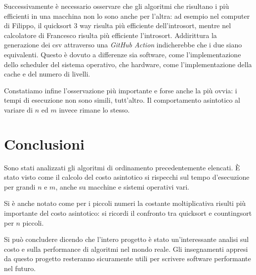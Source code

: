 \documentclass{article}
\begin{document}
    Successivamente è necessario osservare che gli algoritmi che risultano i più efficienti in una macchina non lo sono anche per l'altra: ad esempio nel computer di Filippo, il quicksort 3 way risulta più efficiente dell'introsort, mentre nel calcolatore di Francesco risulta più efficiente l'introsort. Addirittura la generazione dei csv attraverso una \textit{GitHub Action} indicherebbe che i due siano equivalenti. Questo è dovuto a differenze sia software, come l'implementazione dello scheduler del sistema operativo, che hardware, come l'implementazione della cache e del numero di livelli.

    Constatiamo infine l'osservazione più importante e forse anche la più ovvia: i tempi di esecuzione non sono simili, tutt'altro. Il comportamento asintotico al variare di $n$ ed $m$ invece rimane lo stesso.

\section{Conclusioni}
    Sono stati analizzati gli algoritmi di ordinamento precedentemente elencati. È stato visto come il calcolo del costo asintotico si rispecchi sul tempo d'esecuzione per grandi $n$ e $m$, anche su macchine e sistemi operativi vari.

    Si è anche notato come per i piccoli numeri la costante moltiplicativa risulti più importante del costo asintotico: si ricordi il confronto tra quicksort e countingsort per $n$ piccoli.

    Si può concludere dicendo che l'intero progetto è stato un'interessante analisi sul costo e sulla performance di algoritmi nel mondo reale. Gli insegnamenti appresi da questo progetto resteranno sicuramente utili per scrivere software performante nel futuro.
\end{document}
